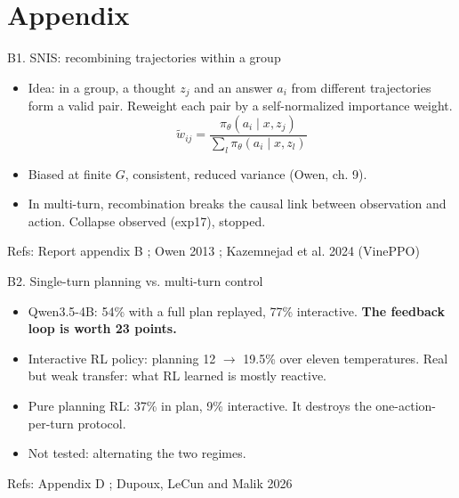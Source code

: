 \documentclass[aspectratio=169,10pt]{beamer}
\newif\ifinappendix
\newcommand{\refs}[1]{\vfill{\tiny\textcolor{crMid}{Refs: #1}}}
\newcommand{\hl}[1]{\textcolor{crOrange}{\textbf{#1}}}
\begin{document}
\appendix
\inappendixtrue
\section{Appendix}

\begin{frame}{B1. SNIS: recombining trajectories within a group}
\begin{itemize}
  \item Idea: in a group, a thought $z_j$ and an answer $a_i$ from different trajectories form a valid pair. Reweight each pair by a self-normalized importance weight.
  \[ \tilde w_{ij} = \frac{\pi_\theta(a_i \mid x, z_j)}{\sum_{l} \pi_\theta(a_i \mid x, z_l)} \]
  \item Biased at finite $G$, consistent, reduced variance (Owen, ch. 9).
  \item In multi-turn, recombination breaks the causal link between observation and action. Collapse observed (exp17), stopped.
\end{itemize}
\refs{Report appendix B ; Owen 2013 ; Kazemnejad et al. 2024 (VinePPO)}
\end{frame}

\begin{frame}{B2. Single-turn planning vs. multi-turn control}
\begin{itemize}
  \item Qwen3.5-4B: 54\% with a full plan replayed, 77\% interactive. \hl{The feedback loop is worth 23 points.}
  \item Interactive RL policy: planning 12 $\to$ 19.5\% over eleven temperatures. Real but weak transfer: what RL learned is mostly reactive.
  \item Pure planning RL: 37\% in plan, 9\% interactive. It destroys the one-action-per-turn protocol.
  \item Not tested: alternating the two regimes.
\end{itemize}
\refs{Appendix D ; Dupoux, LeCun and Malik 2026}
\end{frame}
\end{document}
